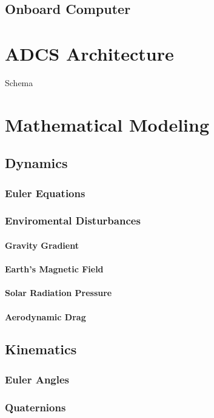 \documentclass[11pt,a4paper]{report}
\begin{document}
\section{Onboard Computer}

\chapter{ADCS Architecture}

Schema

\chapter{Mathematical Modeling}

\section{Dynamics}
\subsection{Euler Equations}
\subsection{Enviromental Disturbances}
\subsubsection{Gravity Gradient}
\subsubsection{Earth's Magnetic Field}
\subsubsection{Solar Radiation Pressure}
\subsubsection{Aerodynamic Drag}
\section{Kinematics}
\subsection{Euler Angles}
\subsection{Quaternions}
\end{document}
